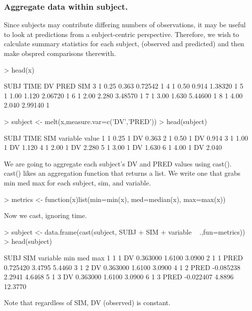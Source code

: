 \subsubsection{Aggregate data within subject.}
Since subjects may contribute differing numbers of observations, it may
be useful to look at predictions from a subject-centric perspective.
Therefore, we wish to calculate summary statistics for each subject, 
(observed and predicted) and then make obspred comparisons therewith.
\begin{Schunk}
\begin{Sinput}
> head(x)
\end{Sinput}
\begin{Soutput}
  SUBJ TIME    DV    PRED SIM
3    1 0.25 0.363 0.72542   1
4    1 0.50 0.914 1.38320   1
5    1 1.00 1.120 2.06720   1
6    1 2.00 2.280 3.48570   1
7    1 3.00 1.630 5.44600   1
8    1 4.00 2.040 2.99140   1
\end{Soutput}
\begin{Sinput}
> subject <- melt(x,measure.var=c('DV','PRED'))
> head(subject)
\end{Sinput}
\begin{Soutput}
  SUBJ TIME SIM variable value
1    1 0.25   1       DV 0.363
2    1 0.50   1       DV 0.914
3    1 1.00   1       DV 1.120
4    1 2.00   1       DV 2.280
5    1 3.00   1       DV 1.630
6    1 4.00   1       DV 2.040
\end{Soutput}
\end{Schunk}
We are going to aggregate each subject's DV and PRED values using cast().
cast() likes an aggregation function that returns a list.
We write one that grabs min med max for each subject, sim, and variable.
\begin{Schunk}
\begin{Sinput}
> metrics <- function(x)list(min=min(x), med=median(x), max=max(x))
\end{Sinput}
\end{Schunk}
Now we cast, ignoring time.
\begin{Schunk}
\begin{Sinput}
> subject <- data.frame(cast(subject, SUBJ + SIM + variable ~ .,fun=metrics))
> head(subject)
\end{Sinput}
\begin{Soutput}
  SUBJ SIM variable       min    med     max
1    1   1       DV  0.363000 1.6100  3.0900
2    1   1     PRED  0.725420 3.4795  5.4460
3    1   2       DV  0.363000 1.6100  3.0900
4    1   2     PRED -0.085238 2.2941  4.6468
5    1   3       DV  0.363000 1.6100  3.0900
6    1   3     PRED -0.022407 4.8896 12.3770
\end{Soutput}
\end{Schunk}
Note that regardless of SIM, DV (observed) is constant.

